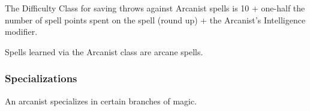 The Difficulty Class for saving throws against Arcanist spells is 10 + one-half the number of spell points spent on the spell (round up) + the Arcanist's Intelligence modifier. 

Spells learned via the Arcanist class are arcane spells.

\subsubsection{Specializations}
\label{sec:Specializations}
An arcanist specializes in certain branches of magic. %


%
% 
